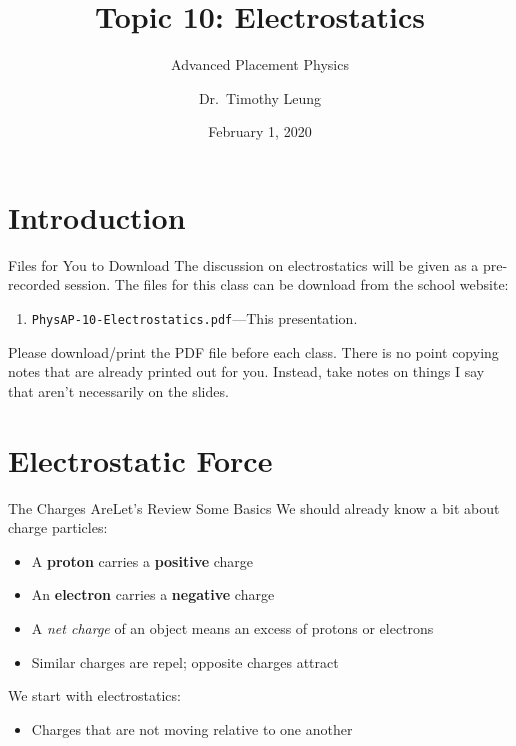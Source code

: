\documentclass[12pt,aspectratio=169]{beamer}
\title{Topic 10: Electrostatics}
\subtitle{Advanced Placement Physics}
\author[TML]{Dr.\ Timothy Leung}
\institute{Olympiads School, Toronto, ON, Canada}
\date{February 1, 2020}
\begin{document}
\begin{frame}
  \maketitle
\end{frame}


\section[Intro]{Introduction}

\begin{frame}{Files for You to Download}
  The discussion on electrostatics will be given as a pre-recorded session.
  The files for this class can be download from the school website:
  \begin{enumerate}
  \item\texttt{PhysAP-10-Electrostatics.pdf}---This presentation.
  \end{enumerate}
  Please download/print the PDF file before each class. There is no point
  copying notes that are already printed out for you. Instead, take notes on
  things I say that aren't necessarily on the slides.
\end{frame}


\section{Electrostatic Force}

\begin{frame}{The Charges Are}{Let's Review Some Basics}
  We should already know a bit about charge particles:
  \begin{itemize}
  \item A \textbf{proton} carries a \textbf{positive} charge
  \item An \textbf{electron} carries a \textbf{negative} charge
  \item A \emph{net charge} of an object means an excess of protons or electrons
  \item Similar charges are repel; opposite charges attract
  \end{itemize}

  \vspace{.2in}We start with electrostatics:
  \begin{itemize}
  \item Charges that are not moving relative to one another
  \end{itemize}
\end{frame}
\end{document}
